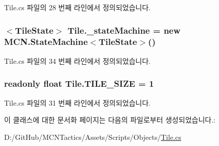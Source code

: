 Tile.\+cs 파일의 28 번째 라인에서 정의되었습니다.

\subsubsection[{\texorpdfstring{\+\_\+state\+Machine}{_stateMachine}}]{$<${\bf Tile\+State}$>$ Tile.\+\_\+state\+Machine = new {\bf M\+C\+N.\+State\+Machine}$<${\bf Tile\+State}$>$()\hspace{0.3cm}{\ttfamily [private]}}\hypertarget{class_tile_a822a1bffe56b1193b8c5c61070ea7827}{}\label{class_tile_a822a1bffe56b1193b8c5c61070ea7827}


Tile.\+cs 파일의 34 번째 라인에서 정의되었습니다.

\subsubsection[{\texorpdfstring{T\+I\+L\+E\+\_\+\+S\+I\+ZE}{TILE_SIZE}}]{\setlength{\rightskip}{0pt plus 5cm}readonly float Tile.\+T\+I\+L\+E\+\_\+\+S\+I\+ZE = 1\hspace{0.3cm}{\ttfamily [static]}}\hypertarget{class_tile_a51b7dea4344573ba12a461a32517e683}{}\label{class_tile_a51b7dea4344573ba12a461a32517e683}


Tile.\+cs 파일의 31 번째 라인에서 정의되었습니다.



이 클래스에 대한 문서화 페이지는 다음의 파일로부터 생성되었습니다.\+:\begin{DoxyCompactItemize}
\item 
D\+:/\+Git\+Hub/\+M\+C\+N\+Tactics/\+Assets/\+Scripts/\+Objects/\hyperlink{_tile_8cs}{Tile.\+cs}\end{DoxyCompactItemize}
